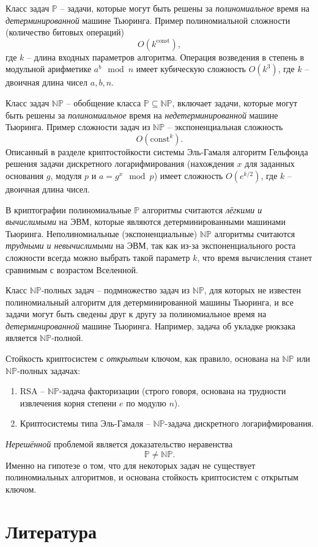\documentclass[10pt,a4paper,openany]{book}
\newcommand{\set}[1]{\mathbb{#1}}
\begin{document}
Класс задач $\set{P}$ -- задачи, которые могут быть решены за \emph{полиномиальное} время на \emph{детерминированной} машине Тьюринга. Пример полиномиальной сложности (количество битовых операций)
    \[ O(k^{\textrm{const}}), \]
где $k$ -- длина входных параметров алгоритма. Операция возведения в степень в модульной арифметике $a^b \mod n$ имеет кубическую сложность $O(k^3)$, где $k$ -- двоичная длина чисел $a,b,n$.

Класс задач $\set{NP}$ -- обобщение класса $\set{P} \subseteq \set{NP}$, включает задачи, которые могут быть решены за \emph{полиномиальное} время на \emph{недетерминированной} машине Тьюринга. Пример сложности задач из $\set{NP}$ -- экспоненциальная сложность
    \[ O(\textrm{const}^k). \]
Описанный в разделе криптостойкости системы Эль-Гамаля алгоритм Гельфонда решения задачи дискретного логарифмирования (нахождения $x$ для заданных основания $g$, модуля $p$ и $a = g^x \mod p$) имеет сложность $O(e^{k/2})$, где $k$ -- двоичная длина чисел.

В криптографии полиномиальные $\set{P}$ алгоритмы считаются \emph{лёгкими и вычислимыми} на ЭВМ, которые являются детерминированными машинами Тьюринга. Неполиномиальные (экспоненциальные) $\set{NP}$ алгоритмы считаются \emph{трудными и невычислимыми} на ЭВМ, так как из-за экспоненциального роста сложности всегда можно выбрать такой параметр $k$, что время вычисления станет сравнимым с возрастом Вселенной.


Класс $\set{NP}$-полных задач -- подмножество задач из $\set{NP}$, для которых не известен полиномиальный алгоритм для детерминированной машины Тьюринга, и все задачи могут быть сведены друг к другу за полиномиальное время на \emph{детерминированной} машине Тьюринга. Например, задача об укладке рюкзака является $\set{NP}$-полной.

Стойкость криптосистем с \emph{открытым} ключом, как правило, основана на $\set{NP}$ или $\set{NP}$-полных задачах:
\begin{enumerate}
    \item RSA -- $\set{NP}$-задача факторизации (строго говоря, основана на трудности извлечения корня степени $e$ по модулю $n$).
    \item Криптосистемы типа Эль-Гамаля -- $\set{NP}$-задача дискретного логарифмирования.
\end{enumerate}

\emph{Нерешённой} проблемой является доказательство неравенства
    \[ \set{P} \neq \set{NP}. \]
Именно на гипотезе о том, что для некоторых задач не существует полиномиальных алгоритмов, и основана стойкость криптосистем с открытым ключом.





\printindex

\chapter*{Литература}
\begingroup
\renewcommand{\chapter}[2]{}%
%
%
\printbibliography
\endgroup
\end{document}
